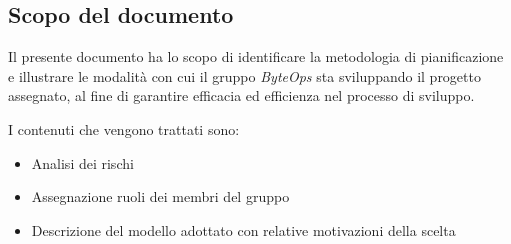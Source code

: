 \subsection{Scopo del documento}
    Il presente documento ha lo scopo di identificare la metodologia di pianificazione e illustrare le modalità con cui il gruppo \textit{ByteOps} sta sviluppando il progetto assegnato, al fine di garantire efficacia ed efficienza nel processo di sviluppo.
    
    I contenuti che vengono trattati sono:
    \begin{itemize}
        \item Analisi dei rischi
        \item Assegnazione ruoli dei membri del gruppo
        \item Descrizione del modello adottato con relative motivazioni della scelta
    \end{itemize}
